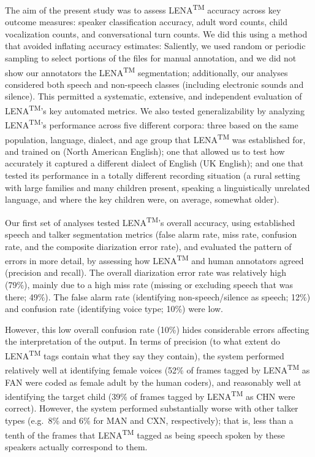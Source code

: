 \documentclass[english,floatsintext,man]{apa6}
\begin{document}
The aim of the present study was to assess LENA\textsuperscript{TM}
accuracy across key outcome measures: speaker classification accuracy,
adult word counts, child vocalization counts, and conversational turn
counts. We did this using a method that avoided inflating accuracy
estimates: Saliently, we used random or periodic sampling to select
portions of the files for manual annotation, and we did not show our
annotators the LENA\textsuperscript{TM} segmentation; additionally, our
analyses considered both speech and non-speech classes (including
electronic sounds and silence). This permitted a systematic, extensive,
and independent evaluation of LENA\textsuperscript{TM}'s key automated
metrics. We also tested generalizability by analyzing
LENA\textsuperscript{TM}'s performance across five different corpora:
three based on the same population, language, dialect, and age group
that LENA\textsuperscript{TM} was established for, and trained on (North
American English); one that allowed us to test how accurately it
captured a different dialect of English (UK English); and one that
tested its performance in a totally different recording situation (a
rural setting with large families and many children present, speaking a
linguistically unrelated language, and where the key children were, on
average, somewhat older).

Our first set of analyses tested LENA\textsuperscript{TM}'s overall
accuracy, using established speech and talker segmentation metrics
(false alarm rate, miss rate, confusion rate, and the composite
diarization error rate), and evaluated the pattern of errors in more
detail, by assessing how LENA\textsuperscript{TM} and human annotators
agreed (precision and recall). The overall diarization error rate was
relatively high (79\%), mainly due to a high miss rate (missing or
excluding speech that was there; 49\%). The false alarm rate
(identifying non-speech/silence as speech; 12\%) and confusion rate
(identifying voice type; 10\%) were low.

However, this low overall confusion rate (10\%) hides considerable
errors affecting the interpretation of the output. In terms of precision
(to what extent do LENA\textsuperscript{TM} tags contain what they say
they contain), the system performed relatively well at identifying
female voices (52\% of frames tagged by LENA\textsuperscript{TM} as FAN
were coded as female adult by the human coders), and reasonably well at
identifying the target child (39\% of frames tagged by
LENA\textsuperscript{TM} as CHN were correct). However, the system
performed substantially worse with other talker types (e.g.~8\% and 6\%
for MAN and CXN, respectively); that is, less than a tenth of the frames
that LENA\textsuperscript{TM} tagged as being speech spoken by these
speakers actually correspond to them.
\end{document}
